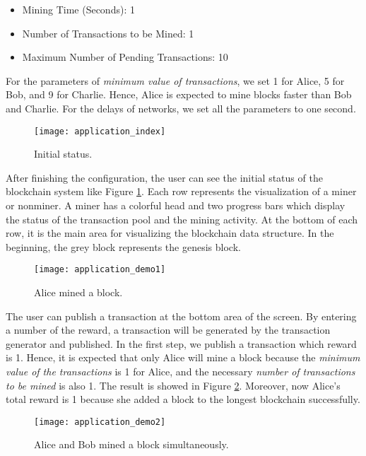 \begin{itemize}
    \item Mining Time (Seconds): 1
    \item Number of Transactions to be Mined: 1
    \item Maximum Number of Pending Transactions: 10
\end{itemize}

For the parameters of \textit{minimum value of transactions}, we set 1 for Alice, 5 for Bob, and 9 for Charlie. Hence, Alice is expected to mine blocks faster than Bob and Charlie. For the delays of networks, we set all the parameters to one second.

\begin{figure}[htb]
    \centering
    \texttt{[image: application\_index]}
    \caption{Initial status.}
    \label{fig:initial status}
\end{figure}

After finishing the configuration, the user can see the initial status of the blockchain system like Figure \ref{fig:initial status}. Each row represents the visualization of a miner or nonminer. A miner has a colorful head and two progress bars which display the status of the transaction pool and the mining activity. At the bottom of each row, it is the main area for visualizing the blockchain data structure. In the beginning, the grey block represents the genesis block.

\begin{figure}[htb]
    \centering
    \texttt{[image: application\_demo1]}
    \caption{Alice mined a block.}
    \label{fig:alice mined a block}
\end{figure}

The user can publish a transaction at the bottom area of the screen. By entering a number of the reward, a transaction will be generated by the transaction generator and published. In the first step, we publish a transaction which reward is 1. Hence, it is expected that only Alice will mine a block because the \textit{minimum value of the transactions} is 1 for Alice, and the necessary \textit{number of transactions to be mined} is also 1. The result is showed in Figure \ref{fig:alice mined a block}. Moreover, now Alice's total reward is 1 because she added a block to the longest blockchain successfully.

\begin{figure}[htb]
    \centering
    \texttt{[image: application\_demo2]}
    \caption{Alice and Bob mined a block simultaneously.}
    \label{fig:alice and bob mined a block simultaneously}
\end{figure}

